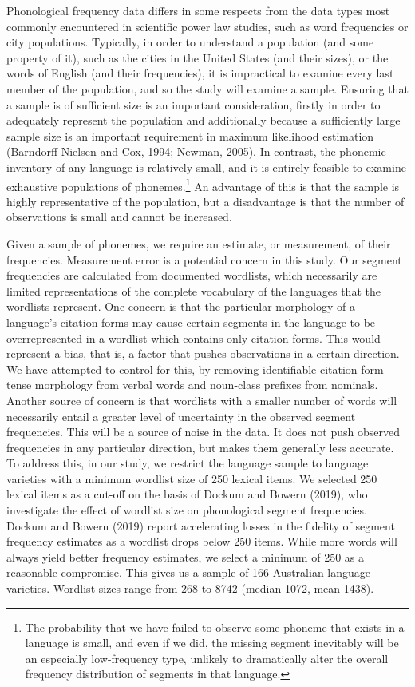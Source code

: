 Phonological frequency data differs in some respects from the data types most commonly encountered in scientific power law studies, such as word frequencies or city populations. Typically, in order to understand a population (and some property of it), such as the cities in the United States (and their sizes), or the words of English (and their frequencies), it is impractical to examine every last member of the population, and so the study will examine a sample. Ensuring that a sample is of sufficient size is an important consideration, firstly in order to adequately represent the population and additionally because a sufficiently large sample size is an important requirement in maximum likelihood estimation (Barndorff-Nielsen and Cox, 1994; Newman, 2005). In contrast, the phonemic inventory of any language is relatively small, and it is entirely feasible to examine exhaustive populations of phonemes.\footnote{The probability that we have failed to observe some phoneme that exists in a language is small, and even if we did, the missing segment inevitably will be an especially low-frequency type, unlikely to dramatically alter the overall frequency distribution of segments in that language.} An advantage of this is that the sample is highly representative of the population, but a disadvantage is that the number of observations is small and cannot be increased.

Given a sample of phonemes, we require an estimate, or measurement, of their frequencies. Measurement error is a potential concern in this study. Our segment frequencies are calculated from documented wordlists, which necessarily are limited representations of the complete vocabulary of the languages that the wordlists represent. One concern is that the particular morphology of a language's citation forms may cause certain segments in the language to be overrepresented in a wordlist which contains only citation forms. This would represent a bias, that is, a factor that pushes observations in a certain direction. We have attempted to control for this, by removing identifiable citation-form tense morphology from verbal words and noun-class prefixes from nominals. Another source of concern is that wordlists with a smaller number of words will necessarily entail a greater level of uncertainty in the observed segment frequencies. This will be a source of noise in the data. It does not push observed frequencies in any particular direction, but makes them generally less accurate. To address this, in our study, we restrict the language sample to language varieties with a minimum wordlist size of 250 lexical items. We selected 250 lexical items as a cut-off on the basis of Dockum and Bowern (2019), who investigate the effect of wordlist size on phonological segment frequencies. Dockum and Bowern (2019) report accelerating losses in the fidelity of segment frequency estimates as a wordlist drops below 250 items. While more words will always yield better frequency estimates, we select a minimum of 250 as a reasonable compromise. This gives us a sample of 166 Australian language varieties. Wordlist sizes range from 268 to 8742 (median 1072, mean 1438). \newline

